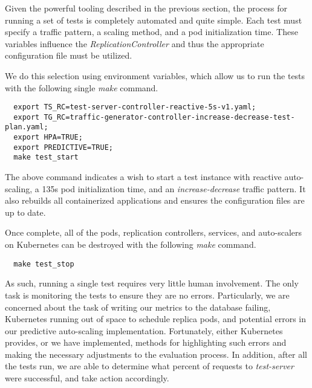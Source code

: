 Given the powerful tooling described in the previous section, the process for
running a set of tests is completely automated and quite simple. Each test
must specify a traffic pattern, a scaling method, and a pod initialization time.
These variables influence the \textit{ReplicationController} and thus the
appropriate configuration file must be utilized.

We do this selection using environment variables, which allow us to run the
tests with the following single \textit{make} command.

\begin{verbatim}
  export TS_RC=test-server-controller-reactive-5s-v1.yaml;
  export TG_RC=traffic-generator-controller-increase-decrease-test-plan.yaml;
  export HPA=TRUE;
  export PREDICTIVE=TRUE;
  make test_start
\end{verbatim}

The above command indicates a wish to start a test instance with reactive
auto-scaling, a 135s pod initialization time, and an
\textit{increase-decrease} traffic pattern. It also rebuilds all containerized
applications and ensures the configuration files are up to date.

Once complete, all of the pods, replication controllers, services, and
auto-scalers on Kubernetes can be destroyed with the following \textit{make}
command.

\begin{verbatim}
  make test_stop
\end{verbatim}

As such, running a single test requires very little human involvement. The only
task is monitoring the tests to ensure they are no errors. Particularly, we are
concerned about the task of writing our metrics to the database failing, Kubernetes
running out of space to schedule replica pods, and potential errors in our
predictive auto-scaling implementation. Fortunately, either Kubernetes provides,
or we have implemented, methods for highlighting such errors and making the
necessary adjustments to the evaluation process. In addition, after all the
tests run, we are able to determine what percent of requests to
\textit{test-server} were successful, and take action accordingly.
